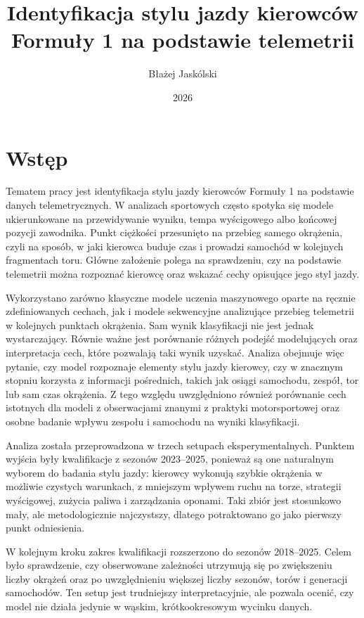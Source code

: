 \documentclass[printmode,pl]{mgr}
\author{Błażej Jaskólski}
\title{Identyfikacja stylu jazdy kierowców Formuły 1 na podstawie telemetrii}
\date{2026}
\begin{document}
\maketitle
\tableofcontents

\chapter{Wstęp}

Tematem pracy jest identyfikacja stylu jazdy kierowców Formuły 1 na podstawie danych telemetrycznych. W analizach sportowych często spotyka się modele ukierunkowane na przewidywanie wyniku, tempa wyścigowego albo końcowej pozycji zawodnika. Punkt ciężkości przesunięto na przebieg samego okrążenia, czyli na sposób, w jaki kierowca buduje czas i prowadzi samochód w kolejnych fragmentach toru. Główne założenie polega na sprawdzeniu, czy na podstawie telemetrii można rozpoznać kierowcę oraz wskazać cechy opisujące jego styl jazdy.

Wykorzystano zarówno klasyczne modele uczenia maszynowego oparte na ręcznie zdefiniowanych cechach, jak i modele sekwencyjne analizujące przebieg telemetrii w kolejnych punktach okrążenia. Sam wynik klasyfikacji nie jest jednak wystarczający. Równie ważne jest porównanie różnych podejść modelujących oraz interpretacja cech, które pozwalają taki wynik uzyskać. Analiza obejmuje więc pytanie, czy model rozpoznaje elementy stylu jazdy kierowcy, czy w znacznym stopniu korzysta z informacji pośrednich, takich jak osiągi samochodu, zespół, tor lub sam czas okrążenia. Z tego względu uwzględniono również porównanie cech istotnych dla modeli z obserwacjami znanymi z praktyki motorsportowej oraz osobne badanie wpływu zespołu i samochodu na wyniki klasyfikacji.

Analiza została przeprowadzona w trzech setupach eksperymentalnych. Punktem wyjścia były kwalifikacje z sezonów 2023--2025, ponieważ są one naturalnym wyborem do badania stylu jazdy: kierowcy wykonują szybkie okrążenia w możliwie czystych warunkach, z mniejszym wpływem ruchu na torze, strategii wyścigowej, zużycia paliwa i zarządzania oponami. Taki zbiór jest stosunkowo mały, ale metodologicznie najczystszy, dlatego potraktowano go jako pierwszy punkt odniesienia.

W kolejnym kroku zakres kwalifikacji rozszerzono do sezonów 2018--2025. Celem było sprawdzenie, czy obserwowane zależności utrzymują się po zwiększeniu liczby okrążeń oraz po uwzględnieniu większej liczby sezonów, torów i generacji samochodów. Ten setup jest trudniejszy interpretacyjnie, ale pozwala ocenić, czy model nie działa jedynie w wąskim, krótkookresowym wycinku danych.
\end{document}
